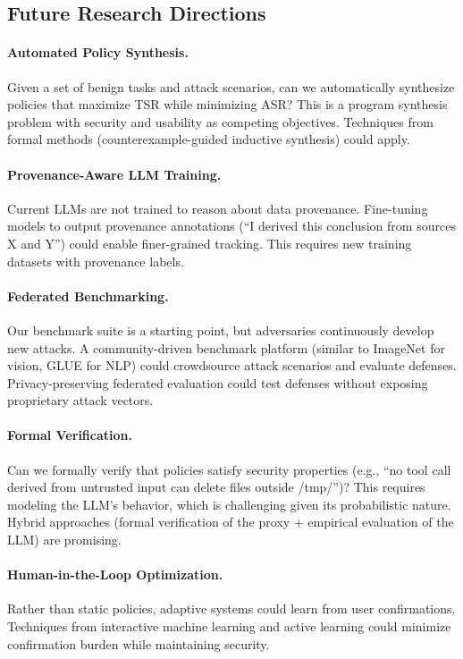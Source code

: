 \subsection{Future Research Directions}

\paragraph{Automated Policy Synthesis.}
Given a set of benign tasks and attack scenarios, can we automatically synthesize policies that maximize
TSR while minimizing ASR? This is a program synthesis problem with security and usability as competing
objectives. Techniques from formal methods (counterexample-guided inductive synthesis) could apply.

\paragraph{Provenance-Aware LLM Training.}
Current LLMs are not trained to reason about data provenance. Fine-tuning models to output provenance
annotations (``I derived this conclusion from sources X and Y'') could enable finer-grained tracking.
This requires new training datasets with provenance labels.

\paragraph{Federated Benchmarking.}
Our benchmark suite is a starting point, but adversaries continuously develop new attacks. A community-driven
benchmark platform (similar to ImageNet for vision, GLUE for NLP) could crowdsource attack scenarios and
evaluate defenses. Privacy-preserving federated evaluation could test defenses without exposing proprietary
attack vectors.

\paragraph{Formal Verification.}
Can we formally verify that \sys{} policies satisfy security properties (e.g., ``no tool call derived from
untrusted input can delete files outside /tmp/'')? This requires modeling the LLM's behavior, which is
challenging given its probabilistic nature. Hybrid approaches (formal verification of the proxy + empirical
evaluation of the LLM) are promising.

\paragraph{Human-in-the-Loop Optimization.}
Rather than static policies, adaptive systems could learn from user confirmations. Techniques from interactive
machine learning and active learning could minimize confirmation burden while maintaining security.

